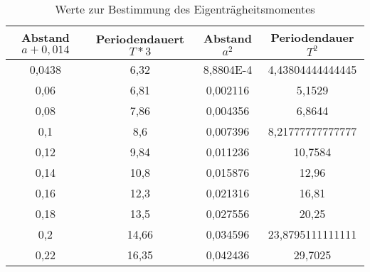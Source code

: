 \begin{table}[h]
	\begin{center}
		\begin{tabular}{cccc}
Abstand $a+0,014$&Periodendauert $T*3$&Abstand $a^2$&Periodendauer $T^2$\\ \hline

0,0438&6,32&8,8804E-4&4,43804444444445\\
0,06&6,81&0,002116&5,1529\\
0,08&7,86&0,004356&6,8644\\
0,1&8,6&0,007396&8,21777777777777\\
0,12&9,84&0,011236&10,7584\\
0,14&10,8&0,015876&12,96\\
0,16&12,3&0,021316&16,81\\
0,18&13,5&0,027556&20,25\\
0,2&14,66&0,034596&23,8795111111111\\
0,22&16,35&0,042436&29,7025\\

			\end{tabular}
		\caption{Werte zur Bestimmung des Eigenträgheitsmomentes}
		\label{tab:eigentragheitsmom}
	\end{center}
\end{table}
